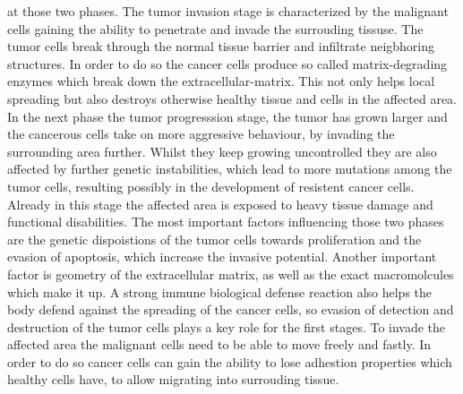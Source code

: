 at those two phases.
The tumor invasion stage is characterized by the malignant cells gaining the ability to penetrate and invade the surrouding tissuse. 
The tumor cells break through the normal tissue barrier and infiltrate neigbhoring structures. In order to do so the cancer cells produce so called 
matrix-degrading enzymes which break down the extracellular-matrix. This not only helps local spreading but also destroys otherwise healthy tissue and cells in the 
affected area. 
In the next phase the tumor progresssion stage, the tumor has grown larger and the cancerous cells take on more aggressive behaviour, by invading the surrounding area further.
Whilst they keep growing uncontrolled they are also affected by further genetic instabilities, which lead to more mutations among the tumor cells, resulting possibly in the 
development of resistent cancer cells. Already in this stage the affected area is exposed to heavy tissue damage and functional disabilities.\newline
The most important factors influencing those two phases are the genetic dispoistions of the tumor cells towards proliferation and the evasion 
of apoptosis, which increase the invasive potential. Another important factor is geometry of the extracellular matrix, as well as the exact macromolcules 
which make it up. A strong immune biological defense reaction also helps the body defend against the spreading of the cancer cells, so evasion of detection and 
destruction of the tumor cells plays a key role for the first stages. To invade the affected area the malignant cells need to be able to move freely and fastly. In order 
to do so cancer cells can gain the ability to lose adhestion properties which healthy cells have, to allow migrating into surrouding tissue. 


